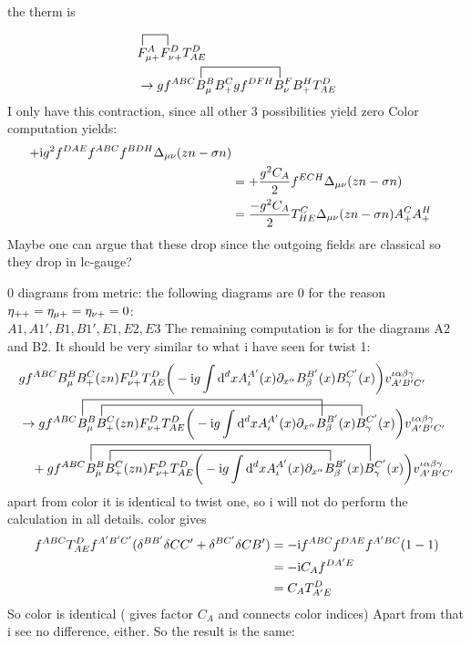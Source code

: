 the therm is

\begin{align}
	\contraction[2ex]{}{\ft}{_{\mu +}^{A} }{\ft}
	&\ft_{\mu +}^{A} \ft _{\nu +}^D T^D_{AE}
	\\
	&\rightarrow
	\contraction[2ex]{g f^{ABC} }{B}{_\mu ^B B_+^C g f^{DFH} }{B}
gf^{ABC} B_\mu ^B B_+^C g f^{DFH} B_\nu ^F B_+^H T^D_{AE}	
\end{align}
I only have this contraction, since all other 3 possibilities yield zero
Color computation yields:
\begin{align}
	+\text{i} g^2f^{DAE}f^{ABC}f^{BDH}\Delta_{\mu \nu}(zn-\sigma n)
	\\
	&=
	+\frac{g^2C_A}{2}f^{ECH}\Delta_{\mu \nu}(zn-\sigma n)
	\\
	&=
	\frac{-g^2C_A}{2}T^C_{HE}\Delta_{\mu \nu}(zn-\sigma n)A_+^CA_+^H
\end{align}
Maybe one can argue that these drop since the outgoing fields are classical so they drop in lc-gauge?

0 diagrams from metric:
the following diagrams are 0 for the reason $\eta_{++}=\eta_{\mu+}=\eta_{\nu+}=0$:\\
$A1,A1',B1,B1',E1,E2,E3$
The remaining computation is for the diagrams A2 and B2.
It should be very similar to what i have seen for twist 1:
\begin{align}
	&g f^{ABC} B_\mu^B B_+^C (zn) \ft_{\nu +}^D T^D_{AE}\bigg(-\imag g \int \ddx xA_\iota^{A'}(x) \partial_{x^\alpha} B_\beta^{B'} (x) B_\gamma^{C'}(x) \bigg) v^{\iota \alpha\beta\gamma}_{A'B'C'}
	\\
	&\rightarrow
	\contraction[3ex]{g f^{ABC}}{B}{_\mu^B B_+^C (zn) \ft_{\nu +}^D T^D_{AE}\bigg(-\imag g \int \ddx xA_\iota^{A'}(x) \partial_{x^\alpha} }{B}
	\contraction[2ex]{g f^{ABC} B_\mu^B }{B}{_+^C (zn) \ft_{\nu +}^D T^D_{AE}\bigg(-\imag g \int \ddx xA_\iota^{A'}(x) \partial_{x^\alpha} B_\beta^{B'} (x) }{B}
	g f^{ABC} B_\mu^B B_+^C (zn) \ft_{\nu +}^D T^D_{AE}\bigg(-\imag g \int \ddx xA_\iota^{A'}(x) \partial_{x^\alpha} B_\beta^{B'} (x) B_\gamma^{C'}(x) \bigg) v^{\iota \alpha\beta\gamma}_{A'B'C'}
	\nl
	\contraction[2ex]{+g f^{ABC} B_\mu^B }{B}{_+^C (zn) \ft_{\nu +}^D T^D_{AE}\bigg(-\imag g \int \ddx xA_\iota^{A'}(x) \partial_{x^\alpha} }{B}
	\contraction[3ex]{+g f^{ABC} }{B}{_\mu^B B_+^C (zn) \ft_{\nu +}^D T^D_{AE}\bigg(-\imag g \int \ddx xA_\iota^{A'}(x) \partial_{x^\alpha} B_\beta^{B'} (x) }{B}
	+g f^{ABC} B_\mu^B B_+^C (zn) \ft_{\nu +}^D T^D_{AE}\bigg(-\imag g \int \ddx xA_\iota^{A'}(x) \partial_{x^\alpha} B_\beta^{B'} (x) B_\gamma^{C'}(x) \bigg) v^{\iota \alpha\beta\gamma}_{A'B'C'}
\end{align}
apart from color it is identical to twist one, so i will not do perform the calculation in all details. color gives
\begin{align}
	f^{ABC}T^D_{AE}f^{A'B'C'}(\delta^{BB'}\delta{CC'}+\delta^{BC'}\delta{CB'})
	&=
	-\text{i} f^{ABC}f^{DAE}f^{A'BC}(1-1)
	\\
	&=-\text{i} C_A f^{DA'E}
	\\
	&=
	C_A T^{D}_{A'E}
\end{align}
So color is identical ( gives factor $C_A$ and connects color indices)
Apart from that i see no difference, either. So the result is the same:

